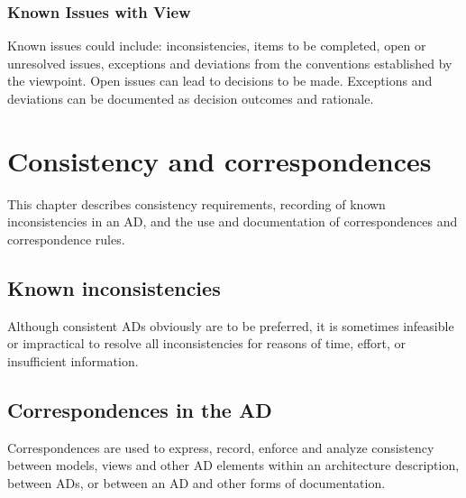 \documentclass[10pt,oneside]{report}
\begin{document}
\subsection{Known Issues with View}\label{known}


Known issues could include: inconsistencies, items to be completed,
open or unresolved issues, exceptions and deviations from the
conventions established by the viewpoint.  Open issues can lead to
decisions to be made. Exceptions and deviations can be documented as
decision outcomes and rationale.



\chapter{Consistency and correspondences}

This chapter describes consistency requirements, recording of known
inconsistencies in an AD, and the use and documentation of
correspondences and correspondence rules.


\section{Known inconsistencies}


Although consistent ADs obviously are to be preferred,
it is sometimes infeasible or impractical to resolve all
inconsistencies for reasons of time, effort, or insufficient
information.



\section{Correspondences in the AD}


Correspondences are used to express, record, enforce and analyze
consistency between models, views and other AD elements within an
architecture description, between ADs, or between an AD and other
forms of documentation.
\end{document}
